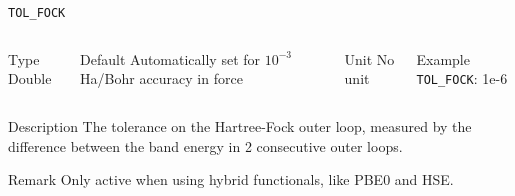 \begin{frame}[allowframebreaks]{\texttt{TOL\_FOCK}} \label{TOL_FOCK}
    \vspace*{-12pt}
    \begin{columns}
    \begin{block}{Type}
    Double
    \end{block}
    
    \begin{block}{Default}
    Automatically set for $10^{-3}$ Ha/Bohr accuracy in force
    \end{block}
    
    \begin{block}{Unit}
    No unit
    \end{block}
    
    \begin{block}{Example}
    \texttt{TOL\_FOCK}: 1e-6
    \end{block}
    \end{columns}
    
    \begin{block}{Description}
    The tolerance on the Hartree-Fock outer loop, measured by the difference between the band energy in 2 consecutive outer loops.
    \end{block}
    
    \begin{block}{Remark}
    Only active when using hybrid functionals, like PBE0 and HSE. 
    \end{block}
    
    \end{frame}
    
    
    
